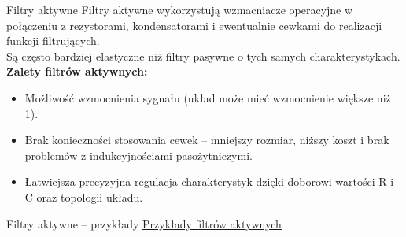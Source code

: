\begin{frame}{Filtry aktywne}
	Filtry aktywne wykorzystują wzmacniacze operacyjne w połączeniu z rezystorami, kondensatorami i ewentualnie cewkami do realizacji funkcji filtrujących.\\
	Są często bardziej elastyczne niż filtry pasywne o tych samych charakterystykach.
	\textbf{Zalety filtrów aktywnych:}
	\begin{itemize}
		\item[\bt] Możliwość wzmocnienia sygnału (układ może mieć wzmocnienie większe niż 1).
		\item[\bt] Brak konieczności stosowania cewek – mniejszy rozmiar, niższy koszt i brak problemów z indukcyjnościami pasożytniczymi.
		\item[\bt] Łatwiejsza precyzyjna regulacja charakterystyk dzięki doborowi wartości R i C oraz topologii układu.
	\end{itemize}
\end{frame}

\begin{frame}{Filtry aktywne – przykłady}
	\href{https://www.falstad.com/afilter/circuitjs.html?startCircuit=filt-hipass.txt}{Przykłady filtrów aktywnych}
\end{frame}